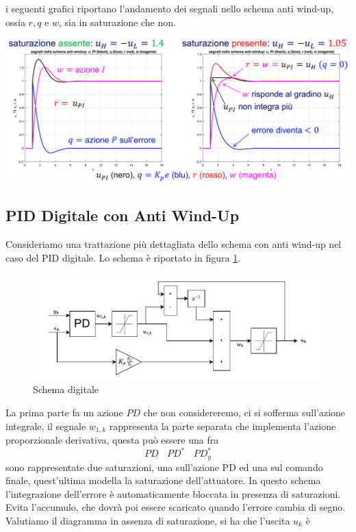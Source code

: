 \documentclass[10pt, letterpaper]{report}
\begin{document}
i seguenti grafici riportano l'andamento dei segnali nello schema anti wind-up, ossia $r,q$ e $w$, sia in saturazione che non.
\begin{center}
    \includegraphics[width=1\textwidth]{images/antiWindUp4.png}
\end{center}
\subsection{PID Digitale con Anti Wind-Up}
Consideriamo una trattazione più dettagliata dello schema con anti wind-up nel caso del PID digitale. Lo schema è riportato in figura \ref{PIDdigAntiWindup}.
\begin{figure}[h!]
    \centering 
    \includegraphics[width=1\textwidth]{images/schemaDigitalePidAntiWindup.pdf}
    \caption{Schema digitale}
    \label{PIDdigAntiWindup}
\end{figure}
La prima parte fa un azione $PD$ che non considereremo, ci si sofferma sull'azione integrale, il segnale $w_{1,k}$ rappresenta la parte separata che implementa l'azione proporzionale derivativa, questa può essere una fra 
$$ PD \ \ \ \ PD^* \ \ \ \ PD^*_y$$
sono rappresentate due saturazioni, una sull'azione PD ed una sul comando finale, quest'ultima modella la saturazione dell'attuatore. In questo schema l'integrazione dell'errore è automaticamente bloccata in presenza di saturazioni. Evita l'accumulo, che dovrà poi essere scaricato quando l'errore cambia di segno.\acc 
Valutiamo il diagramma in assenza di saturazione, si ha che l'uscita $u_k$ è 
\end{document}
